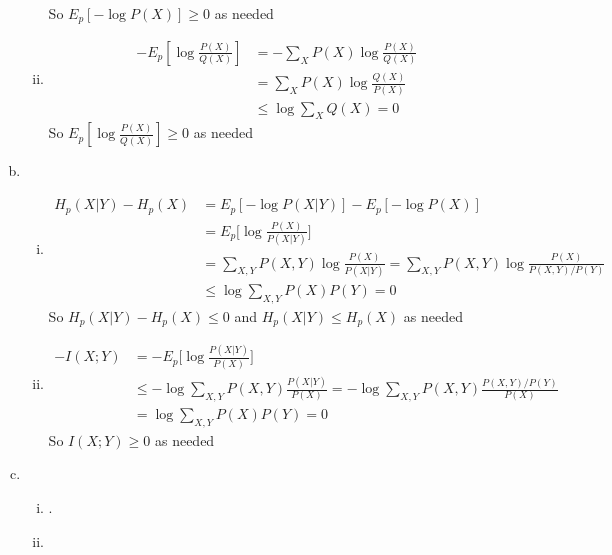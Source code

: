 \documentclass{article}
\begin{document}
\begin{enumerate}[(a)]
\begin{enumerate}[(i)]
\begin{align*}
        \end{align*}
        So $E_p[- \log P(X)] \geq 0$ as needed 
        \item \begin{align*}
            - E_p[\log \frac{P(X)}{Q(X)}] &= - \sum_X P(X) \log \frac{P(X)}{Q(X)} \\
            &= \sum_X P(X) \log \frac{Q(X)}{P(X)} \\
            &\leq \log \sum_X Q(X) = 0
        \end{align*}
        So $E_p[\log \frac{P(X)}{Q(X)}] \geq 0$ as needed 
    \end{enumerate}
    \item \begin{enumerate}[(i)]
        \item \begin{align*}
            H_p(X|Y) - H_p(X) &= E_p[-\log P(X|Y)] - E_p[-\log P(X)] \\ 
            &= E_p\bigg[\log \frac{P(X)}{P(X|Y)}\bigg] \\
            &= \sum_{X, Y} P(X, Y) \log \frac{P(X)}{P(X|Y)} = \sum_{X, Y} P(X, Y) \log \frac{P(X)}{P(X, Y)/P(Y)}\\
            &\leq \log \sum_{X,Y} P(X)P(Y) = 0
        \end{align*}
        So $H_p(X|Y) - H_p(X) \leq 0$ and $H_p(X|Y) \leq H_p(X)$ as needed 
        \item \begin{align*}
            -I(X;Y) &= -E_p\bigg[\log \frac{P(X|Y)}{P(X)}\bigg] \\
            &\leq -\log \sum_{X, Y} P(X, Y) \frac{P(X|Y)}{P(X)} = -\log \sum_{X, Y} P(X, Y)\frac{P(X,Y)/P(Y)}{P(X)} \\
            &= \log \sum_{X, Y}P(X)P(Y) = 0
        \end{align*}
        So $I(X;Y) \geq 0$ as needed
    \end{enumerate}
    \item  \begin{enumerate}[(i)]
        \item .
        \item 
    \end{enumerate}
\end{enumerate}
\end{document}
